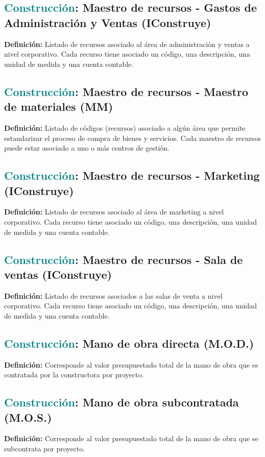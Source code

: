 \documentclass[12pt]{article}
\begin{document}
\subsection{\textcolor{teal}{Construcción}: Maestro de recursos - Gastos de Administración y Ventas (IConstruye)}
\textbf{Definición:} Listado de recursos asociado al área de administración y ventas a nivel corporativo. Cada recurso tiene asociado un código, una descripción, una unidad de medida y una cuenta contable.
\subsection{\textcolor{teal}{Construcción}: Maestro de recursos - Maestro de materiales (MM)}
\textbf{Definición:} Listado de códigos (recursos) asociado a algún área que permite estandarizar el proceso de compra de bienes y servicios. Cada maestro de recursos puede estar asociado a uno o más centros de gestión.
\subsection{\textcolor{teal}{Construcción}: Maestro de recursos - Marketing (IConstruye)}
\textbf{Definición:} Listado de recursos asociado al área de marketing a nivel corporativo. Cada recurso tiene asociado un código, una descripción, una unidad de medida y una cuenta contable.
\subsection{\textcolor{teal}{Construcción}: Maestro de recursos - Sala de ventas (IConstruye)}
\textbf{Definición:} Listado de recursos asociados a las salas de venta a nivel corporativo. Cada recurso tiene asociado un código, una descripción, una unidad de medida y una cuenta contable.
\subsection{\textcolor{teal}{Construcción}: Mano de obra directa (M.O.D.)}
\textbf{Definición:} Corresponde al valor presupuestado total de la mano de obra que es contratada por la constructora por proyecto.
\subsection{\textcolor{teal}{Construcción}: Mano de obra subcontratada (M.O.S.)}
\textbf{Definición:} Corresponde al valor presupuestado total de la mano de obra que se subcontrata por proyecto.
\end{document}

